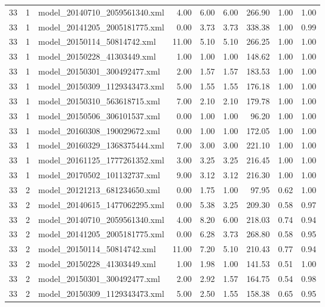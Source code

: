 \begin{table}[ht]
\begin{tabular}{rrlrrrrrr}
   33 &   1 & model\_20140710\_2059561340.xml & 4.00 & 6.00 & 6.00 & 266.90 & 1.00 & 1.00 \\ 
   33 &   1 & model\_20141205\_2005181775.xml & 0.00 & 3.73 & 3.73 & 338.38 & 1.00 & 0.99 \\ 
   33 &   1 & model\_20150114\_50814742.xml & 11.00 & 5.10 & 5.10 & 266.25 & 1.00 & 1.00 \\ 
   33 &   1 & model\_20150228\_41303449.xml & 1.00 & 1.00 & 1.00 & 148.62 & 1.00 & 1.00 \\ 
   33 &   1 & model\_20150301\_300492477.xml & 2.00 & 1.57 & 1.57 & 183.53 & 1.00 & 1.00 \\ 
   33 &   1 & model\_20150309\_1129343473.xml & 5.00 & 1.55 & 1.55 & 176.18 & 1.00 & 1.00 \\ 
   33 &   1 & model\_20150310\_563618715.xml & 7.00 & 2.10 & 2.10 & 179.78 & 1.00 & 1.00 \\ 
   33 &   1 & model\_20150506\_306101537.xml & 0.00 & 1.00 & 1.00 & 96.20 & 1.00 & 1.00 \\ 
   33 &   1 & model\_20160308\_190029672.xml & 0.00 & 1.00 & 1.00 & 172.05 & 1.00 & 1.00 \\ 
   33 &   1 & model\_20160329\_1368375444.xml & 7.00 & 3.00 & 3.00 & 221.10 & 1.00 & 1.00 \\ 
   33 &   1 & model\_20161125\_1777261352.xml & 3.00 & 3.25 & 3.25 & 216.45 & 1.00 & 1.00 \\ 
   33 &   1 & model\_20170502\_101132737.xml & 9.00 & 3.12 & 3.12 & 216.30 & 1.00 & 1.00 \\ 
   33 &   2 & model\_20121213\_681234650.xml & 0.00 & 1.75 & 1.00 & 97.95 & 0.62 & 1.00 \\ 
   33 &   2 & model\_20140615\_1477062295.xml & 0.00 & 5.38 & 3.25 & 209.30 & 0.58 & 0.97 \\ 
   33 &   2 & model\_20140710\_2059561340.xml & 4.00 & 8.20 & 6.00 & 218.03 & 0.74 & 0.94 \\ 
   33 &   2 & model\_20141205\_2005181775.xml & 0.00 & 6.28 & 3.73 & 268.80 & 0.58 & 0.95 \\ 
   33 &   2 & model\_20150114\_50814742.xml & 11.00 & 7.20 & 5.10 & 210.43 & 0.77 & 0.94 \\ 
   33 &   2 & model\_20150228\_41303449.xml & 1.00 & 1.98 & 1.00 & 141.53 & 0.51 & 1.00 \\ 
   33 &   2 & model\_20150301\_300492477.xml & 2.00 & 2.92 & 1.57 & 164.75 & 0.54 & 0.98 \\ 
   33 &   2 & model\_20150309\_1129343473.xml & 5.00 & 2.50 & 1.55 & 158.38 & 0.65 & 0.95 \\ 

\end{tabular}
\end{table}
